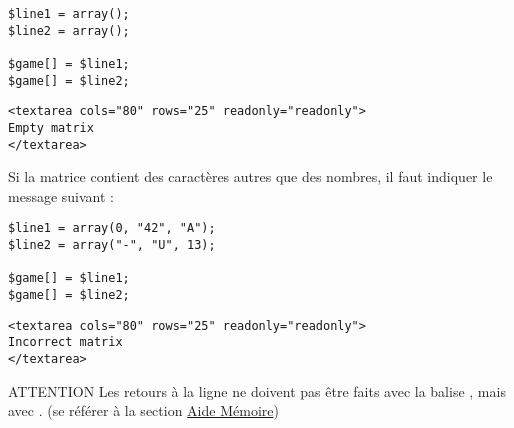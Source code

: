 \noindent {}

\bigskip

\lstset{language=php}
\begin{lstlisting}[frame=single,title={Exemple de matrice vide (exo4\_data.php)}]
$line1 = array();
$line2 = array();

$game[] = $line1;
$game[] = $line2;
\end{lstlisting}

\lstset{language=html}
\begin{lstlisting}[frame=single,title={Cas d'erreur 1 : matrice vide}]
<textarea cols="80" rows="25" readonly="readonly">
Empty matrix
</textarea>
\end{lstlisting}

\noindent Si la matrice contient des caractères autres que des nombres, il faut indiquer le message suivant :

\bigskip

\noindent {}

\bigskip

\lstset{language=php}
\begin{lstlisting}[frame=single,title={Exemple de matrice incorrecte (exo4\_data.php)}]
$line1 = array(0, "42", "A");
$line2 = array("-", "U", 13);

$game[] = $line1;
$game[] = $line2;
\end{lstlisting}

\lstset{language=html}
\begin{lstlisting}[frame=single,title={Cas d'erreur 2 : matrice incorrecte}]
<textarea cols="80" rows="25" readonly="readonly">
Incorrect matrix
</textarea>
\end{lstlisting}

\bigskip

\begin{RedBoxTitle}{ATTENTION}
    Les retours à la ligne ne doivent pas être faits avec la balise , mais avec .
    (se référer à la section \hyperref[sec:AideMemoire]{Aide Mémoire})
\end{RedBoxTitle}
